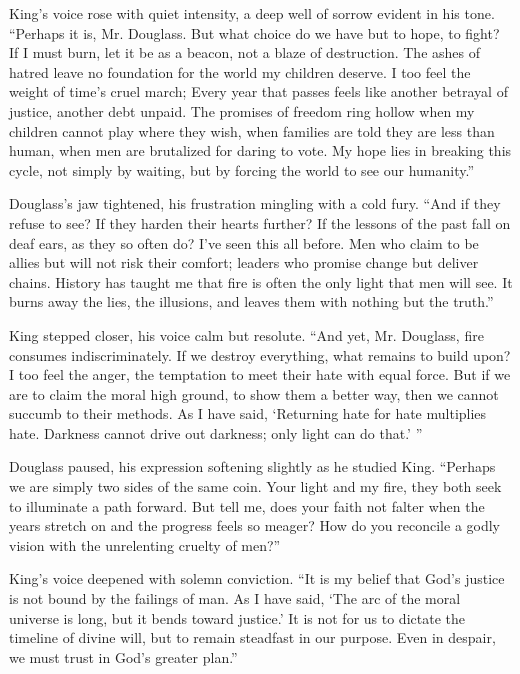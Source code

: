 \documentclass[12pt]{article}
\begin{document}
King’s voice rose with quiet intensity, a deep well of sorrow evident in his tone. {\color{kingcolor}``Perhaps it is, Mr. Douglass. But what choice do we have but to hope, to fight? If I must burn, let it be as a beacon, not a blaze of destruction. The ashes of hatred leave no foundation for the world my children deserve. I too feel the weight of time’s cruel march; Every year that passes feels like another betrayal of justice, another debt unpaid. The promises of freedom ring hollow when my children cannot play where they wish, when families are told they are less than human, when men are brutalized for daring to vote. My hope lies in breaking this cycle, not simply by waiting, but by forcing the world to see our humanity.''}

Douglass’s jaw tightened, his frustration mingling with a cold fury. {\color{douglasscolor}``And if they refuse to see? If they harden their hearts further? If the lessons of the past fall on deaf ears, as they so often do? I’ve seen this all before. Men who claim to be allies but will not risk their comfort; leaders who promise change but deliver chains. History has taught me that fire is often the only light that men will see. It burns away the lies, the illusions, and leaves them with nothing but the truth.''}

King stepped closer, his voice calm but resolute. {\color{kingcolor}``And yet, Mr. Douglass, fire consumes indiscriminately. If we destroy everything, what remains to build upon? I too feel the anger, the temptation to meet their hate with equal force. But if we are to claim the moral high ground, to show them a better way, then we cannot succumb to their methods. As I have said, `Returning hate for hate multiplies hate. Darkness cannot drive out darkness; only light can do that.' \parencite{king1963letter}''}

Douglass paused, his expression softening slightly as he studied King. {\color{douglasscolor}``Perhaps we are simply two sides of the same coin. Your light and my fire, they both seek to illuminate a path forward. But tell me, does your faith not falter when the years stretch on and the progress feels so meager? How do you reconcile a godly vision with the unrelenting cruelty of men?''}

King’s voice deepened with solemn conviction. {\color{kingcolor}``It is my belief that God’s justice is not bound by the failings of man. As I have said, `The arc of the moral universe is long, but it bends toward justice.' It is not for us to dictate the timeline of divine will, but to remain steadfast in our purpose. Even in despair, we must trust in God’s greater plan.''}
\end{document}
